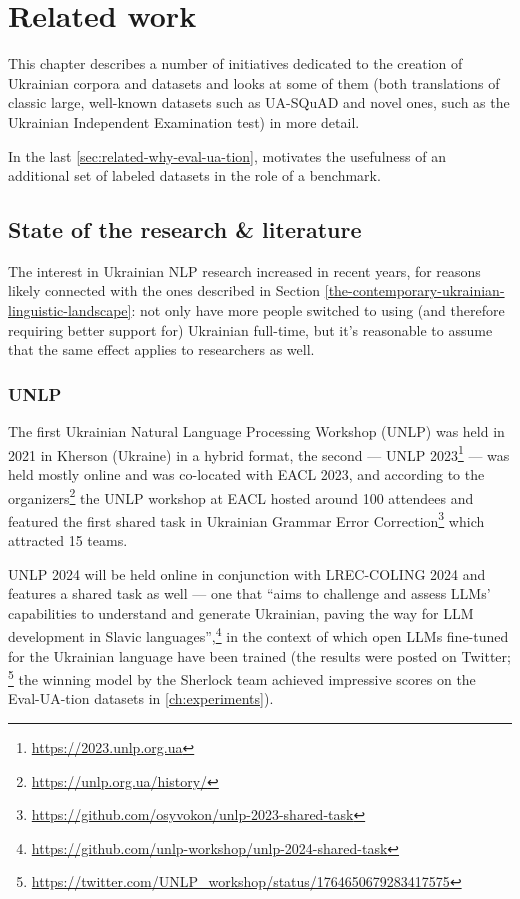 \chapter{Related work}\label{related-work}
This chapter describes a number of initiatives dedicated to the creation 
of Ukrainian corpora and datasets and looks at some of them (both translations of classic large, well-known datasets such as UA-SQuAD and novel ones, such as the Ukrainian Independent Examination test) in more detail.

In the last \autoref{sec:related-why-eval-ua-tion},  motivates the usefulness of an additional set of labeled datasets in the role of a benchmark.

\section{State of the research \&
literature}\label{sec:state-of-the-research--literature}
The interest in Ukrainian NLP research increased in recent years, for reasons likely connected with the ones described in Section \ref{the-contemporary-ukrainian-linguistic-landscape}: not only have more people switched to using (and therefore requiring better support for) Ukrainian full-time, 
but it's reasonable to assume that the same effect applies to researchers as well.

\subsection{UNLP}
\label{sec:unlp}
The first Ukrainian Natural Language Processing Workshop (UNLP) was held in 2021 in Kherson (Ukraine) in a hybrid format, 
the second — UNLP 2023\footnote{\href{https://2023.unlp.org.ua/}{https://2023.unlp.org.ua}} — 
was held mostly online and was co-located with EACL 2023, and according to the organizers\footnote{\href{https://unlp.org.ua/history/}{https://unlp.org.ua/history/}} the UNLP workshop at EACL hosted around 100 attendees and featured the first shared task in Ukrainian Grammar Error Correction\footnote{\href{https://github.com/osyvokon/unlp-2023-shared-task}{https://github.com/osyvokon/unlp-2023-shared-task}} which attracted 15 teams.

UNLP 2024 will be held online in conjunction with LREC-COLING 2024 and features a shared task as well — one that ``aims to challenge and assess LLMs’ capabilities to understand and generate Ukrainian, paving the way for LLM development in Slavic languages'',\footnote{\href{https://github.com/unlp-workshop/unlp-2024-shared-task}{https://github.com/unlp-workshop/unlp-2024-shared-task}} in the context of which open LLMs fine-tuned for the Ukrainian language have been trained (the results were posted on Twitter;%
\footnote{ 
\href{https://twitter.com/UNLP_workshop/status/1764650679283417575}{https://twitter.com/UNLP\_workshop/status/1764650679283417575}} the winning model by the Sherlock team achieved impressive scores on the Eval-UA-tion datasets in \autoref{ch:experiments}).

